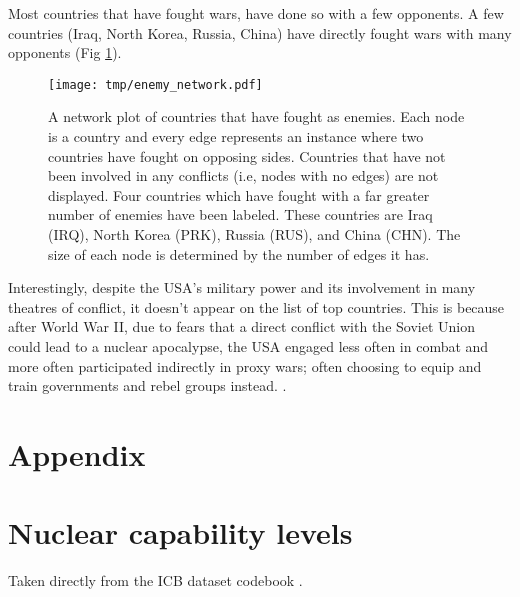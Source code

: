 \documentclass[12pt,parskip=half-]{scrartcl}
\begin{document}
\begin{minipage}{\textwidth}
    Most countries that have fought wars, have done so with a few opponents.  A
    few countries (Iraq, North Korea, Russia, China) have directly fought wars
    with many opponents (Fig \ref{enemy_network.pdf}).

    \begin{figure}
        \centering
        \texttt{[image: tmp/enemy\_network.pdf]}
        \caption{A network plot of countries that have fought as enemies. Each node
            is a country and every edge represents an instance where two countries
            have fought on opposing sides. Countries that have not been involved in
            any conflicts (i.e, nodes with no edges) are not displayed. Four
            countries which have fought with a far greater number of enemies have
            been labeled. These countries are Iraq (IRQ), North Korea (PRK),
            Russia (RUS), and China (CHN). The size of each node is determined
            by the number of edges it has.}
        \label{enemy_network.pdf}
    \end{figure}

    Interestingly, despite the USA's military power and its involvement in many
    theatres of conflict, it doesn't appear on the list of top countries. This
    is because after World War II, due to fears that a direct conflict with the
    Soviet Union could lead to a nuclear apocalypse, the USA engaged less often
    in combat and more often participated indirectly in proxy wars; often
    choosing to equip and train governments and rebel groups instead.
    \cite{mad}. 
\end{minipage}

\section{Appendix}
\appendix

\section{Nuclear capability levels}\label{nuclearcapabilitydefs}

Taken directly from the ICB dataset codebook \cite{icbcodebook}.
\end{document}
